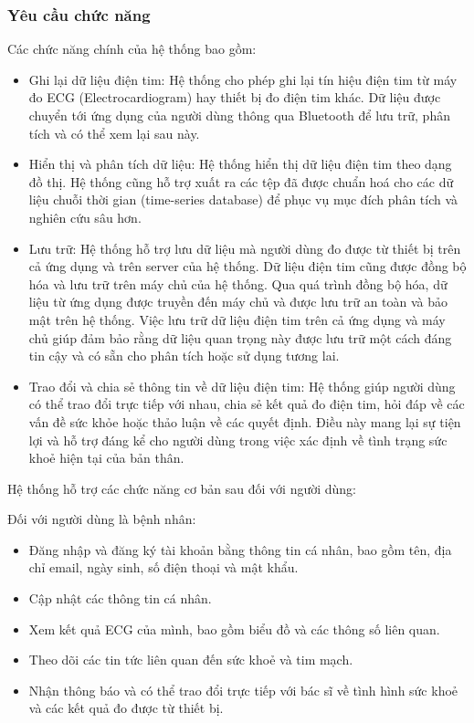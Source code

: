 \documentclass{article}%
\begin{document}
\subsubsection{Yêu cầu chức năng}
Các chức năng chính của hệ thống bao gồm: 
\begin{itemize}
    \item Ghi lại dữ liệu điện tim: Hệ thống cho phép ghi lại tín hiệu điện tim từ máy đo ECG (Electrocardiogram) hay thiết bị đo điện tim khác. Dữ liệu được chuyển tới ứng dụng của người dùng thông qua Bluetooth để lưu trữ, phân tích và có thể xem lại sau này.

    \item Hiển thị và phân tích dữ liệu: Hệ thống hiển thị dữ liệu điện tim theo dạng đồ thị. Hệ thống cũng hỗ trợ xuất ra các tệp đã được chuẩn hoá cho các dữ liệu chuỗi thời gian (time-series database) để phục vụ mục đích phân tích và nghiên cứu sâu hơn.

    \item Lưu trữ: Hệ thống hỗ trợ lưu dữ liệu mà người dùng đo được từ thiết bị trên cả ứng dụng và trên server của hệ thống. Dữ liệu điện tim cũng được đồng bộ hóa và lưu trữ trên máy chủ của hệ thống. Qua quá trình đồng bộ hóa, dữ liệu từ ứng dụng được truyền đến máy chủ và được lưu trữ an toàn và bảo mật trên hệ thống. Việc lưu trữ dữ liệu điện tim trên cả ứng dụng và máy chủ giúp đảm bảo rằng dữ liệu quan trọng này được lưu trữ một cách đáng tin cậy và có sẵn cho phân tích hoặc sử dụng tương lai.

    \item Trao đổi và chia sẻ thông tin về dữ liệu điện tim: Hệ thống giúp người dùng có thể trao đổi trực tiếp với nhau, chia sẻ kết quả đo điện tim, hỏi đáp về các vấn đề sức khỏe hoặc thảo luận về các quyết định. Điều này mang lại sự tiện lợi và hỗ trợ đáng kể cho người dùng trong việc xác định về tình trạng sức khoẻ hiện tại của bản thân.
\end{itemize}
Hệ thống hỗ trợ các chức năng cơ bản sau đối với người dùng:

Đối với người dùng là bệnh nhân:
\begin{itemize}
    \item Đăng nhập và đăng ký tài khoản bằng thông tin cá nhân, bao gồm tên, địa chỉ email, ngày sinh, số điện thoại và mật khẩu.
    \item Cập nhật các thông tin cá nhân.
    \item Xem kết quả ECG của mình, bao gồm biểu đồ và các thông số liên quan.
    \item Theo dõi các tin tức liên quan đến sức khoẻ và tim mạch.
    \item Nhận thông báo và có thể trao đổi trực tiếp với bác sĩ về tình hình sức khoẻ và các kết quả đo được từ thiết bị.
\end{itemize}
\end{document}
